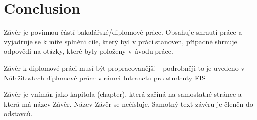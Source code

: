 \chapter*{Conclusion}

Závěr je povinnou částí bakalářské/diplomové práce. Obsahuje shrnutí práce a vyjadřuje se k míře splnění cíle, který byl v práci stanoven, případně shrnuje odpovědi na otázky, které byly položeny v úvodu práce. 

Závěr k diplomové práci musí být propracovanější -- podrobněji to je uvedeno v Náležitostech diplomové práce v rámci Intranetu pro studenty FIS.

Závěr je vnímán jako kapitola (chapter), která začíná na samostatné stránce a která má název Závěr.  Název Závěr se nečísluje. Samotný text závěru je členěn do odstavců.